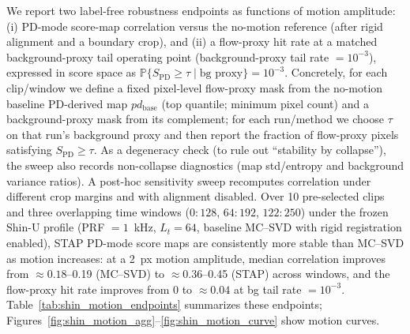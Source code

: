 We report two label-free robustness endpoints as functions of motion amplitude: (i) PD-mode score-map correlation versus the no-motion reference (after rigid alignment and a boundary crop), and (ii) a flow-proxy hit rate at a matched background-proxy tail operating point (background-proxy tail rate $=10^{-3}$), expressed in score space as $\mathbb{P}\{S_{\mathrm{PD}}\ge\tau\mid \text{bg proxy}\}=10^{-3}$. Concretely, for each clip/window we define a fixed pixel-level flow-proxy mask from the no-motion baseline PD-derived map $pd_{\mathrm{base}}$ (top quantile; minimum pixel count) and a background-proxy mask from its complement; for each run/method we choose $\tau$ on that run's background proxy and then report the fraction of flow-proxy pixels satisfying $S_{\mathrm{PD}}\ge\tau$. As a degeneracy check (to rule out ``stability by collapse''), the sweep also records non-collapse diagnostics (map std/entropy and background variance ratios). A post-hoc sensitivity sweep recomputes correlation under different crop margins and with alignment disabled.
Over 10 pre-selected clips and three overlapping time windows ($0{:}128$, $64{:}192$, $122{:}250$) under the frozen Shin-U profile (PRF $=1$~kHz, $L_t=64$, baseline MC--SVD with rigid registration enabled), STAP PD-mode score maps are consistently more stable than MC--SVD as motion increases: at a 2~px motion amplitude, median correlation improves from $\approx 0.18$--0.19 (MC--SVD) to $\approx 0.36$--0.45 (STAP) across windows, and the flow-proxy hit rate improves from 0 to $\approx 0.04$ at bg tail rate $=10^{-3}$. Table~\ref{tab:shin_motion_endpoints} summarizes these endpoints; Figures~\ref{fig:shin_motion_agg}--\ref{fig:shin_motion_curve} show motion curves.

